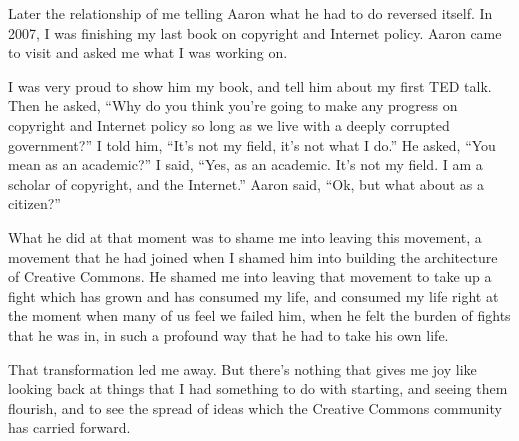 Later the relationship of me telling Aaron what he had to do reversed
itself. In 2007, I was finishing my last book on copyright and Internet
policy. Aaron came to visit and asked me what I was working on.

I was very proud to show him my book, and tell him about my first TED
talk. Then he asked, ``Why do you think you're going to make any
progress on copyright and Internet policy so long as we live with a
deeply corrupted government?'' I told him, ``It's not my field, it's not
what I do.'' He asked, ``You mean as an academic?'' I said, ``Yes, as an
academic. It's not my field. I am a scholar of copyright, and the
Internet.'' Aaron said, ``Ok, but what about as a citizen?''

What he did at that moment was to shame me into leaving this movement, a
movement that he had joined when I shamed him into building the
architecture of Creative Commons. He shamed me into leaving that
movement to take up a fight which has grown and has consumed my life,
and consumed my life right at the moment when many of us feel we failed
him, when he felt the burden of fights that he was in, in such a
profound way that he had to take his own life.

That transformation led me away. But there's nothing that gives me joy
like looking back at things that I had something to do with starting,
and seeing them flourish, and to see the spread of ideas which the
Creative Commons community has carried forward.
